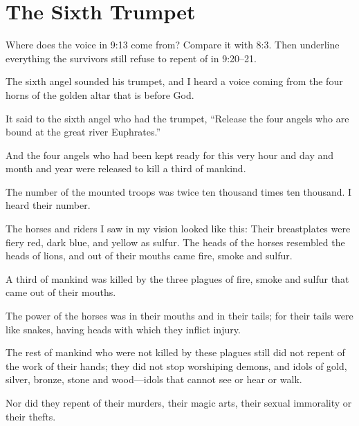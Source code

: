 \section{The Sixth Trumpet}

\begin{ScriptureBox2}{Where does the voice in 9:13 come from? Compare it with 8:3. Then underline everything the survivors still refuse to repent of in 9:20--21.}

\item[9:13] The sixth angel sounded his trumpet, and I heard a voice coming from the four horns of the golden altar that is before God.

\item[9:14] It said to the sixth angel who had the trumpet, ``Release the four angels who are bound at the great river Euphrates.''

\item[9:15] And the four angels who had been kept ready for this very hour and day and month and year were released to kill a third of mankind.

\item[9:16] The number of the mounted troops was twice ten thousand times ten thousand. I heard their number.

\item[9:17] The horses and riders I saw in my vision looked like this: Their breastplates were fiery red, dark blue, and yellow as sulfur. The heads of the horses resembled the heads of lions, and out of their mouths came fire, smoke and sulfur.

\item[9:18] A third of mankind was killed by the three plagues of fire, smoke and sulfur that came out of their mouths.

\item[9:19] The power of the horses was in their mouths and in their tails; for their tails were like snakes, having heads with which they inflict injury.

\item[9:20] The rest of mankind who were not killed by these plagues still did not repent of the work of their hands; they did not stop worshiping demons, and idols of gold, silver, bronze, stone and wood---idols that cannot see or hear or walk.

\item[9:21] Nor did they repent of their murders, their magic arts, their sexual immorality or their thefts.

\end{ScriptureBox2}

